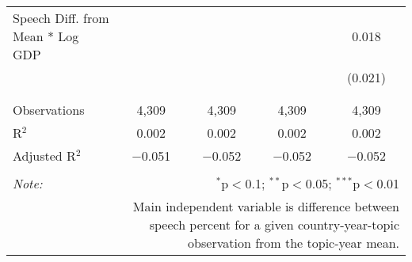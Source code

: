 \begin{table}[!htbp]
\begin{tabular}{@{\extracolsep{5pt}}lcccc}
 Speech Diff. from Mean * Log GDP &  &  &  & 0.018 \\ 
  &  &  &  & (0.021) \\ 
  & & & & \\ 
\hline \\[-1.8ex] 
Observations & 4,309 & 4,309 & 4,309 & 4,309 \\ 
R$^{2}$ & 0.002 & 0.002 & 0.002 & 0.002 \\ 
Adjusted R$^{2}$ & $-$0.051 & $-$0.052 & $-$0.052 & $-$0.052 \\ 
\hline 
\hline \\[-1.8ex] 
\textit{Note:}  & \multicolumn{4}{r}{$^{*}$p$<$0.1; $^{**}$p$<$0.05; $^{***}$p$<$0.01} \\ 
 & \multicolumn{4}{r}{Main independent variable is difference between speech percent for a given country-year-topic observation from the topic-year mean.} \\ 
\end{tabular} 
\end{table} 
